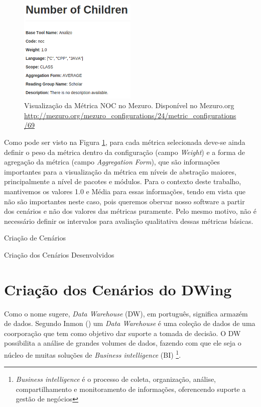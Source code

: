 \graphicspath{{figuras/}}
\begin{figure}[h]
\centering
\includegraphics[width=0.5\textwidth]{metric_example}
\caption{Visualização da Métrica NOC no Mezuro. Disponível no Mezuro.org \url{http://mezuro.org/mezuro_configurations/24/metric_configurations/69}}
\label{metric_example}
\end{figure}

Como pode ser visto na Figura \ref{metric_example}, para cada métrica selecionada deve-se ainda definir o peso da métrica dentro da configuração (campo \emph{Weight}) e a forma de agregação da métrica (campo \emph{Aggregation Form}), que são informações importantes para a visualização da métrica em níveis de abstração maiores, principalmente a nível de pacotes e módulos. Para o contexto deste trabalho, mantivemos os valores 1.0 e Média para essas informações, tendo em vista que não são importantes neste caso, pois queremos obervar nosso software a partir dos cenários e não dos valores das métricas puramente. Pelo mesmo motivo, não é necessário definir os intervalos para avaliação qualitativa dessas métricas básicas.

\begin{description}
	\item[Criação de Cenários]
\end{description}


\begin{description}
	\item[Criação dos Cenários Desenvolvidos]
\end{description}


\section{Criação dos Cenários do DWing}
\label{dw-cenarios}

Como o nome sugere, \emph{Data Warehouse} (DW), em português, significa armazém de dados. Segundo Inmon (\citeyear{inmon2002}) um \emph{Data Warehouse} é uma coleção de dados de uma coorporação que tem como objetivo dar suporte a tomada de decisão. 
%
O DW possibilita a análise de grandes volumes de dados, fazendo com que ele seja o núcleo de muitas soluções de \emph{Business intelligence} (BI)
%
\footnote{\emph{Business intelligence} é o processo de coleta, organização, análise, compartilhamento e monitoramento de informações, oferencendo suporte a gestão de negócios}. 
%

